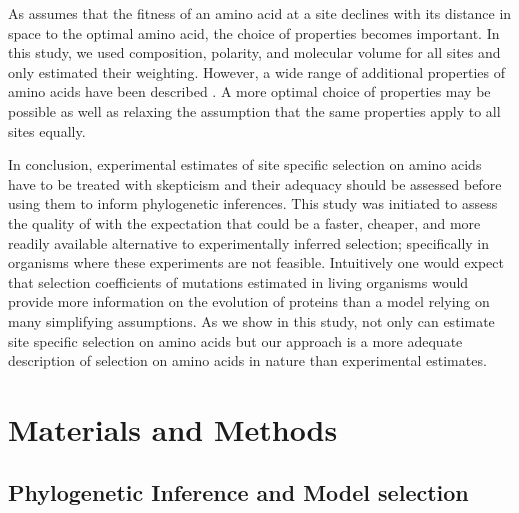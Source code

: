 
As \selac assumes that the fitness of an amino acid at a site declines with its distance in \PC space to the optimal amino acid, the choice of \PC properties becomes important.
In this study, we used composition, polarity, and molecular volume \citep{grantham1974} for all sites and only estimated their weighting.
However, a wide range of additional \PC properties of amino acids have been described \citep{Kawashima2008}.
A more optimal choice of \PC properties may be possible as well as relaxing the assumption that the same properties apply to all sites equally.

In conclusion, experimental estimates of site specific selection on amino acids have to be treated with skepticism and their adequacy should be assessed before using them to inform phylogenetic inferences.
This study was initiated to assess the quality of \selac with the expectation that \selac could be a faster, cheaper, and more readily available alternative to experimentally inferred selection;
specifically in organisms where these experiments are not feasible.
Intuitively one would expect that selection coefficients of mutations estimated in living organisms would provide more information on the evolution of proteins than a model relying on many simplifying assumptions.
As we show in this study, not only can \selac estimate site specific selection on amino acids but our approach is a more adequate description of selection on amino acids in nature than experimental estimates.


\section{Materials and Methods}

\subsection{Phylogenetic Inference and Model selection}

